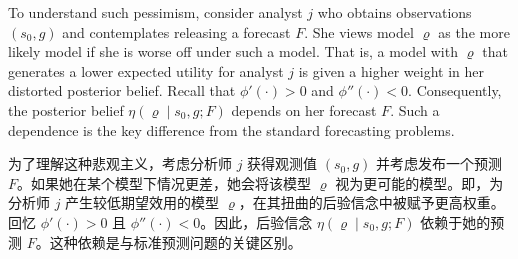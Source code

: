 \documentclass[12pt,a4paper]{article}
\newenvironment{original}
  {\par\medskip\noindent\ignorespaces}
  {\par\medskip}
\newenvironment{translation}
  {\par\noindent{\color{transblue}\ignorespaces}}
  {\par\bigskip}
\begin{document}
\begin{original}
To understand such pessimism, consider analyst $j$ who obtains observations $(s_0, g)$ and contemplates releasing a forecast $F$. She views model $\varrho$ as the more likely model if she is worse off under such a model. That is, a model with $\varrho$ that generates a lower expected utility for analyst $j$ is given a higher weight in her distorted posterior belief. Recall that $\phi'(\cdot) > 0$ and $\phi''(\cdot) < 0$. Consequently, the posterior belief $\eta(\varrho \mid s_0, g; F)$ depends on her forecast $F$. Such a dependence is the key difference from the standard forecasting problems.
\end{original}
\begin{translation}
为了理解这种悲观主义，考虑分析师 $j$ 获得观测值 $(s_0, g)$ 并考虑发布一个预测 $F$。如果她在某个模型下情况更差，她会将该模型 $\varrho$ 视为更可能的模型。即，为分析师 $j$ 产生较低期望效用的模型 $\varrho$，在其扭曲的后验信念中被赋予更高权重。回忆 $\phi'(\cdot) > 0$ 且 $\phi''(\cdot) < 0$。因此，后验信念 $\eta(\varrho \mid s_0, g; F)$ 依赖于她的预测 $F$。这种依赖是与标准预测问题的关键区别。
\end{translation}
\end{document}
